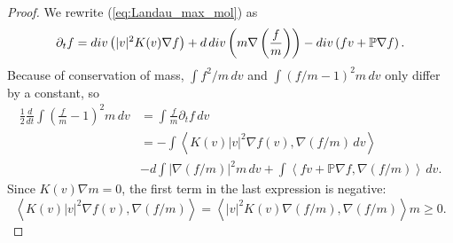 \documentclass[10pt,a4paper]{amsart}
\begin{document}
\begin{proof}
 We rewrite (\ref{eq:Landau_max_mol}) as 
 \begin{align*}
  \partial_{t}f  =\textnormal{div}\left(\vert v\vert^{2}K(v)\nabla f\right)+d\,\textnormal{div}\left( m \nabla \left(\frac{f}{ m } \right)\right)-\textnormal{div}\left(fv+\mathbb{P}\nabla f\right).
\end{align*}
Because of conservation of mass,  $\int f^2/m\,dv$ and $\int \left(f/m-1\right)^2m\,dv$ only differ by a constant, so
  \begin{align*}
    \frac{1}{2}\frac{d}{dt}\int\left(\frac{f}{ m }-1\right)^{2} m\,dv & 
    = \int \frac{f}{m}\partial_tf\,dv \\
    & = -\int\left\langle K(v)\left\vert v \right\vert ^{2}\nabla f(v),\nabla\left(f/ m \right)\,dv \right\rangle \\ 
    & -d\int\left\vert \nabla\left(f/ m \right) \right\vert ^{2} m\,dv 
    +\int\left\langle fv+\mathbb{P}\nabla f,\nabla(f/ m ) \right\rangle\,dv .
  \end{align*}
  Since $K(v) \nabla m =0$, the first term in the last expression is negative:
  \begin{equation*}
    \left\langle K(v)\left\vert v \right\vert ^{2}\nabla f(v),\nabla\left(f/ m \right) \right\rangle =\left\langle \left\vert v \right\vert ^{2}K(v)\nabla(f/ m ),\nabla\left(f/ m \right) \right\rangle  m \geq0.
  \end{equation*}
  

\end{proof}
\end{document}
